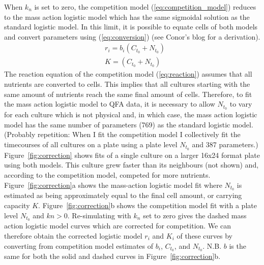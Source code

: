 When \(k_{n}\) is set to zero, the competition model
(\ref{eq:competition_model}) reduces to the mass action logistic model
which has the same sigmoidal solution as the standard logistic
model. In this limit, it is possible to equate cells of both models
and convert parameters using (\ref{eq:conversion}) (see Conor's blog
for a derivation).
\begin{subequations}
  \label{eq:conversion}
  \begin{align}
    &r_{i} = b_{i}(C_{t_{0}} + N_{t_{0}})\\
    &K = (C_{t_{0}} + N_{t_{0}})
  \end{align}
\end{subequations}
%
The reaction equation of the competition model (\ref{eq:reaction})
assumes that all nutrients are converted to cells. This implies that
all cultures starting with the same amount of nutrients reach the same
final amount of cells. Therefore, to fit the mass action logistic
model to QFA data, it is necessary to allow \(N_{t_{0}}\) to vary for
each culture which is not physical and, in which case, the mass action
logistic model has the same number of parameters (769) as the standard
logistic model. (Probably repetition: When I fit the competition model
I collectively fit the timecourses of all cultures on a plate using a
plate level \(N_{t_{0}}\) and 387 parameters.)
%
Figure~\ref{fig:correction} shows fits of a single culture on a larger
16x24 format plate using both models. This culture grew faster than
its neighbours (not shown) and, according to the competition model,
competed for more nutrients.
%
Figure~\ref{fig:correction}a shows the mass-action logistic model fit
where \(N_{t_{0}}\) is estimated as being approximately equal to the
final cell amount, or carrying capacity \(K\).
%
Figure~\ref{fig:correction}b shows the competition model fit with a
plate level \(N_{t_{0}}\) and \(kn > 0\). Re-simulating with \(k_{n}\)
set to zero gives the dashed mass action logistic model curves which
are corrected for competition. We can therefore obtain the corrected
logistic model \(r_{i}\) and \(K_{i}\) of these curves by converting
from competition model estimates of \(b_{i}\), \(C_{t_{0}}\), and
\(N_{t_{0}}\). N.B. \(b\) is the same for both the solid and dashed
curves in Figure~\ref{fig:correction}b.

%

